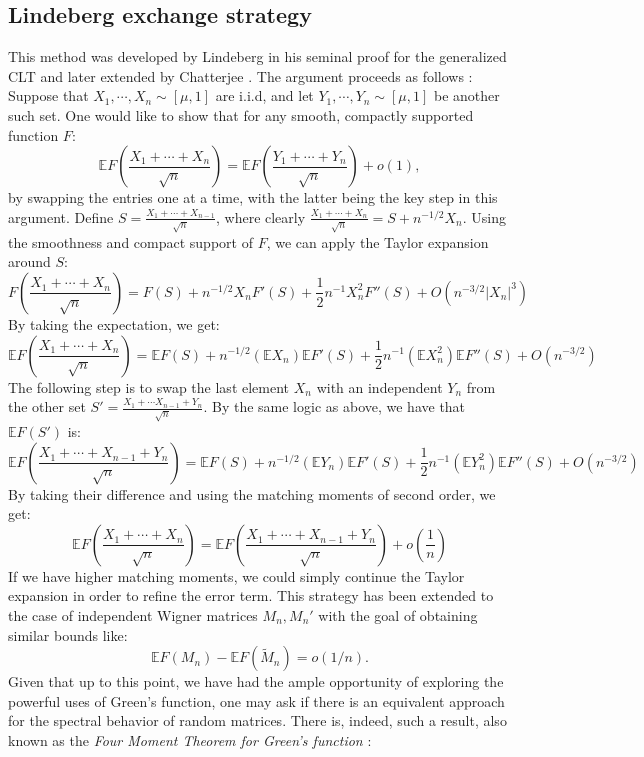 \documentclass[11pt]{article}
\begin{document}
\subsection{Lindeberg exchange strategy}
This method was developed by Lindeberg in his seminal proof for the generalized CLT \cite{lindeberg} and later extended by Chatterjee \cite{chatterjee}. The argument proceeds as follows \cite{tao}: Suppose that $X_1, \cdots, X_n\sim [\mu, 1]$ are i.i.d, and let $Y_1, \cdots, Y_n\sim[\mu, 1]$ be another such set. One would like to show that for any smooth, compactly supported function $F$: $$\mathbb{E}F\left(\frac{X_1+\cdots+X_n}{\sqrt{n}}\right) = \mathbb{E}F\left(\frac{Y_1+\cdots+Y_n}{\sqrt{n}}\right)+o(1),$$
by swapping the entries one at a time, with the latter being the key step in this argument.  Define
$S= \frac{X_1+\cdots+X_{n-1}}{\sqrt{n}}$, where clearly $ \frac{X_1+\cdots+X_n}{\sqrt{n}}=S+n^{-1/2}X_n $. Using the smoothness and compact support of $F$, we can apply the Taylor expansion around $S$: $$F\left(\frac{X_1+\cdots+X_n}{\sqrt{n}}\right)=F(S)+n^{-1/2}X_nF'(S)+\frac{1}{2}n^{-1}X_n^2 F''(S) + O(n^{-3/2}|X_n|^3)$$
By taking the expectation, we get: 
$$ \mathbb{E}F\left(\frac{X_1+\cdots+X_n}{\sqrt{n}}\right)=\mathbb{E}F(S)+n^{-1/2}(\mathbb{E}X_n)\mathbb{E}F'(S)+\frac{1}{2}n^{-1}(\mathbb{E}X_n^2)\mathbb{E}F''(S) + O(n^{-3/2})$$
The following step is to swap the last element $X_n$ with an independent $Y_n$ from the other set $S' = \frac{X_1+\cdots X_{n-1}+Y_n}{\sqrt{n}}$. By the same logic as above, we have that $\mathbb{E}F(S')$ is: 
$$ \mathbb{E}F\left(\frac{X_1+\cdots+X_{n-1}+Y_n}{\sqrt{n}}\right)=\mathbb{E}F(S)+n^{-1/2}(\mathbb{E}Y_n)\mathbb{E}F'(S)+\frac{1}{2}n^{-1}(\mathbb{E}Y_n^2)\mathbb{E}F''(S) +O (n^{-3/2})$$
By taking their difference and using the matching moments of second order, we get: 
$$ \mathbb{E}F\left(\frac{X_1+\cdots+X_n}{\sqrt{n}}\right) = \mathbb{E}F\left(\frac{X_1+\cdots+X_{n-1}+Y_n}{\sqrt{n}}\right)+o\left(\frac{1}{n}\right)$$
If we have higher matching moments, we could simply continue the Taylor expansion in order to refine the error term.
This strategy has been extended to the case of independent Wigner matrices $M_n, M_n'$ with the goal of obtaining similar bounds like: $$\mathbb{E}F(M_n)-\mathbb{E}F(\tilde{M}_n)=o(1/n).$$ 
\noindent Given that up to this point, we have had the ample opportunity of exploring the powerful uses of Green's function, one may ask if there is an equivalent approach for the spectral behavior of random matrices. There is, indeed, such a result, also known as the \textit{Four Moment Theorem for Green's function} \cite{tao2}:
\end{document}
